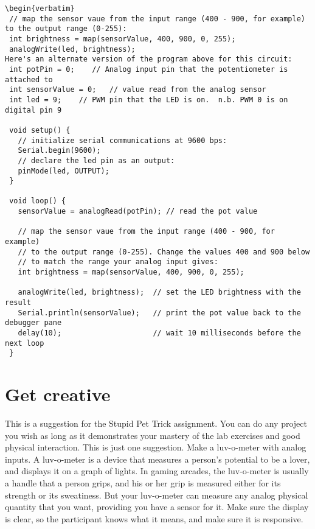 \begin{verbatim}
\begin{verbatim}
 // map the sensor vaue from the input range (400 - 900, for example) to the output range (0-255):
 int brightness = map(sensorValue, 400, 900, 0, 255);
 analogWrite(led, brightness);
Here's an alternate version of the program above for this circuit:
 int potPin = 0;    // Analog input pin that the potentiometer is attached to
 int sensorValue = 0;   // value read from the analog sensor
 int led = 9;    // PWM pin that the LED is on.  n.b. PWM 0 is on digital pin 9

 void setup() {
   // initialize serial communications at 9600 bps:
   Serial.begin(9600); 
   // declare the led pin as an output:
   pinMode(led, OUTPUT);
 }

 void loop() {
   sensorValue = analogRead(potPin); // read the pot value

   // map the sensor vaue from the input range (400 - 900, for example) 
   // to the output range (0-255). Change the values 400 and 900 below
   // to match the range your analog input gives:
   int brightness = map(sensorValue, 400, 900, 0, 255); 

   analogWrite(led, brightness);  // set the LED brightness with the result
   Serial.println(sensorValue);   // print the pot value back to the debugger pane
   delay(10);                     // wait 10 milliseconds before the next loop
 }
\end{verbatim}

\section{Get creative}

This is a suggestion for the Stupid Pet Trick assignment. You can do any project you wish as long as it demonstrates your mastery of the lab exercises and good physical interaction. This is just one suggestion.
Make a luv-o-meter with analog inputs. A luv-o-meter is a device that measures a person's potential to be a lover, and displays it on a graph of lights. In gaming arcades, the luv-o-meter is usually a handle that a person grips, and his or her grip is measured either for its strength or its sweatiness. But your luv-o-meter can measure any analog physical quantity that you want, providing you have a sensor for it. Make sure the display is clear, so the participant knows what it means, and make sure it is responsive.
